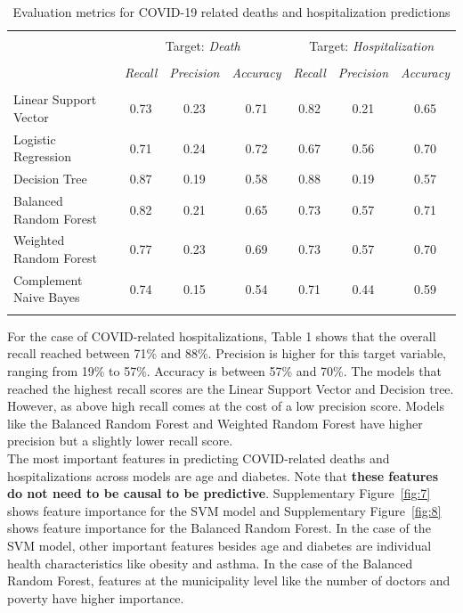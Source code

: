 \documentclass[hidelinks,10pt]{article}
\begin{document}
\begin{table}[!htbp] \centering 
	\captionsetup{justification=centering}  
	\caption{Evaluation metrics for COVID-19 related deaths and hospitalization predictions} 
	\label{} 
	\begin{tabular}{@{\extracolsep{5pt}}lccc|ccc} 
		\\[-2.5ex]\hline 
		\hline \\[-2.5ex] 
		& \multicolumn{3}{c}{Target: \textit{Death}} & \multicolumn{3}{c}{Target: \textit{Hospitalization}}\\ 
		\cline{2-7} 
		\\[-2.5ex]& \textit{Recall}& \textit{Precision} &\textit{Accuracy}& \textit{Recall}& \textit{Precision} &\textit{Accuracy}\\ 
		\hline \\[-2.5ex] 
		Linear Support Vector     & 0.73 & 0.23 &0.71& 0.82 & 0.21 &0.65\\ 
		
		Logistic Regression         & 0.71 & 0.24&0.72& 0.67 & 0.56&0.70 \\ 
		
		Decision Tree                  & 0.87& 0.19&0.58& 0.88& 0.19&0.57\\ 
		
		Balanced Random Forest& 0.82& 0.21 &0.65& 0.73& 0.57&0.71\\ 
		
		Weighted Random Forest& 0.77 & 0.23 &0.69& 0.73 & 0.57 &0.70\\ 
		
		Complement Naive Bayes&0.74  &0.15 &0.54&0.71  &0.44 &0.59 \\ 
		\hline 
		\hline \\[-2.5ex] 
	\end{tabular} 
\end{table} 
For the case of  COVID-related hospitalizations, Table 1 shows that the overall recall reached between 71\% and 88\%. Precision is higher for this target variable, ranging from 19\% to 57\%. Accuracy is between 57\% and 70\%. The models that reached the highest recall scores are the Linear Support Vector and Decision tree. However, as above high recall comes at the cost of a low precision score. Models like the Balanced Random Forest and Weighted Random Forest have higher precision but a slightly lower recall score.\\


The most important features in predicting COVID-related deaths and hospitalizations across models are age and diabetes. Note that \textbf{these features do not need to be causal to be predictive}. Supplementary Figure~\ref{fig:7} shows feature importance for the SVM model and Supplementary Figure~\ref{fig:8} shows feature importance for the Balanced Random Forest. In the case of the SVM model, other important features besides age and diabetes are individual health characteristics like obesity and asthma. In the case of the Balanced Random Forest, features at the municipality level like the number of doctors and poverty have higher importance.
\end{document}

